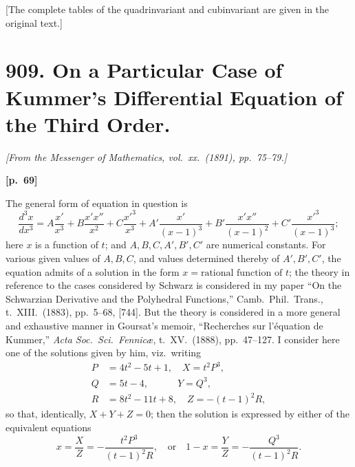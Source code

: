 \documentclass[11pt,a4paper]{book}
\begin{document}
[The complete tables of the quadrinvariant and cubinvariant are given in the original text.]

\newpage

\section*{909. On a Particular Case of Kummer's Differential Equation of the Third Order.}

\noindent\textit{[From the Messenger of Mathematics, vol.\ xx.\ (1891), pp.\ 75--79.]}

\vspace{0.5em}
\noindent\textbf{[p.\ 69]}

The general form of equation in question is
$$
\frac{d^3 x}{dx^3} = A \frac{x'}{x^3} + B \frac{x' x''}{x^2} + C \frac{x'^3}{x^3} + A' \frac{x'}{(x - 1)^3} + B' \frac{x' x''}{(x - 1)^2} + C' \frac{x'^3}{(x - 1)^3};
$$
here $x$ is a function of $t$; and $A, B, C, A', B', C'$ are numerical constants. For various given values of $A, B, C$, and values determined thereby of $A', B', C'$, the equation admits of a solution in the form $x = \text{rational function of } t$; the theory in reference to the cases considered by Schwarz is considered in my paper ``On the Schwarzian Derivative and the Polyhedral Functions,'' Camb.\ Phil.\ Trans., t.\ XIII.\ (1883), pp.\ 5--68, [744]. But the theory is considered in a more general and exhaustive manner in Goursat's memoir, ``Recherches sur l'\'equation de Kummer,'' \textit{Acta Soc.\ Sci.\ Fennic\ae}, t.\ XV.\ (1888), pp.\ 47--127. I consider here one of the solutions given by him, viz.\ writing
\begin{align*}
P &= 4t^2 - 5t + 1, \quad X = t^2 P^3, \\
Q &= 5t - 4, \qquad\quad Y = Q^3, \\
R &= 8t^2 - 11t + 8, \quad Z = -(t - 1)^2 R,
\end{align*}
so that, identically, $X + Y + Z = 0$; then the solution is expressed by either of the equivalent equations
$$
x = \frac{X}{Z} = -\frac{t^2 P^3}{(t - 1)^2 R}, \quad \text{or} \quad 1 - x = \frac{Y}{Z} = -\frac{Q^3}{(t - 1)^2 R}.
$$
\end{document}
